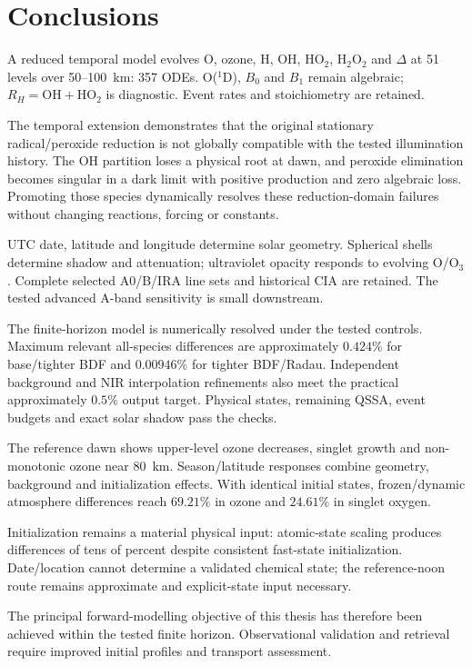 \chapter{Conclusions}\label{ch:conclusions}
A reduced temporal model evolves O, ozone, H, OH, HO$_2$, H$_2$O$_2$ and $\Delta$ at 51 levels over 50--100~km: 357 ODEs. O($^1$D), $B_0$ and $B_1$ remain algebraic; $R_H=\mathrm{OH}+\mathrm{HO_2}$ is diagnostic. Event rates and stoichiometry are retained.

The temporal extension demonstrates that the original stationary radical/peroxide reduction is not globally compatible with the tested illumination history. The OH partition loses a physical root at dawn, and peroxide elimination becomes singular in a dark limit with positive production and zero algebraic loss. Promoting those species dynamically resolves these reduction-domain failures without changing reactions, forcing or constants.

UTC date, latitude and longitude determine solar geometry. Spherical shells determine shadow and attenuation; ultraviolet opacity responds to evolving O/O$_3$. Complete selected A0/B/IRA line sets and historical CIA are retained. The tested advanced A-band sensitivity is small downstream.

The finite-horizon model is numerically resolved under the tested controls. Maximum relevant all-species differences are approximately $0.424\%$ for base/tighter BDF and $0.00946\%$ for tighter BDF/Radau. Independent background and NIR interpolation refinements also meet the practical approximately $0.5\%$ output target. Physical states, remaining QSSA, event budgets and exact solar shadow pass the checks.

The reference dawn shows upper-level ozone decreases, singlet growth and non-monotonic ozone near 80~km. Season/latitude responses combine geometry, background and initialization effects. With identical initial states, frozen/dynamic atmosphere differences reach $69.21\%$ in ozone and $24.61\%$ in singlet oxygen.

Initialization remains a material physical input: atomic-state scaling produces differences of tens of percent despite consistent fast-state initialization. Date/location cannot determine a validated chemical state; the reference-noon route remains approximate and explicit-state input necessary.

The principal forward-modelling objective of this thesis has therefore been achieved within the tested finite horizon. Observational validation and retrieval require improved initial profiles and transport assessment.

